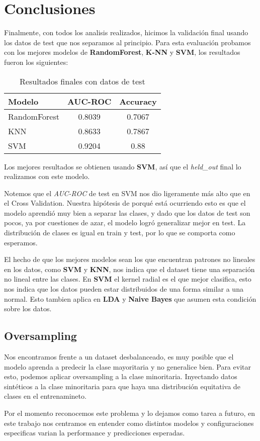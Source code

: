 \section*{Conclusiones}

Finalmente, con todos los analisis realizados, hicimos la validación final usando los datos de test 
que nos separamos al principio. Para esta evaluación probamos con los mejores modelos 
de \textbf{RandomForest}, \textbf{K-NN} y \textbf{SVM}, los resultados fueron los siguientes:
\begin{table}[H]
    \centering
    \begin{tabular}{l|cc}
        \hline
        \textbf{Modelo} & \textbf{AUC-ROC} & \textbf{Accuracy} \\ \hline
        RandomForest & 0.8039 & 0.7067 \\ \hline
        KNN & 0.8633 & 0.7867 \\ \hline
        SVM & 0.9204 & 0.88 \\ \hline
    \end{tabular}
    \caption*{Resultados finales con datos de test}
    \label{tab:resultados}
\end{table}

Los mejores resultados se obtienen usando \textbf{SVM}, así que el \textit{held\_out} final lo
realizamos con este modelo.

Notemos que el \textit{AUC-ROC} de test en SVM nos dio ligeramente más alto que en el Cross Validation.
Nuestra hipótesis de porqué está ocurriendo esto es que el modelo aprendió muy bien a separar las clases,
y dado que los datos de test son pocos, ya por cuestiones de azar, el modelo logró generalizar mejor en test.
La distribución de clases es igual en train y test, por lo que se comporta como esperamos.

El hecho de que los mejores modelos sean los que encuentran patrones no lineales
en los datos, como \textbf{SVM} y \textbf{KNN}, nos indica que el dataset tiene una separación no lineal entre las clases.
En \textbf{SVM} el kernel radial es el que mejor clasifica, esto nos indica que los datos pueden estar
distribuidos de una forma similar a una normal.
Esto tambien aplica en \textbf{LDA} y \textbf{Naive Bayes} que asumen esta condición sobre los datos.

\subsection*{Oversampling}
Nos encontramos frente a un dataset desbalanceado,
es muy posible que el modelo aprenda a predecir la clase mayoritaria y no generalice bien.
Para evitar esto, podemos aplicar oversampling a la clase minoritaria.
Inyectando datos sintéticos a la clase minoritaria para que haya una distribución equitativa de clases en el entrenamineto.

Por el momento reconocemos este problema y lo dejamos como tarea a futuro, en este trabajo nos centramos en entender como distintos modelos
y configuraciones especificas varian la performance y predicciones esperadas.